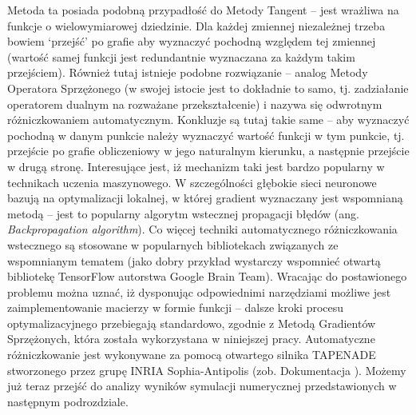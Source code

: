 \documentclass[12pt, twoside]{book}
\begin{document}
Metoda ta posiada podobną przypadłość do Metody Tangent – jest wrażliwa na funkcje o wielowymiarowej dziedzinie. Dla każdej zmiennej niezależnej trzeba bowiem ‘przejść’ po grafie aby wyznaczyć pochodną względem tej zmiennej (wartość samej funkcji jest redundantnie wyznaczana za każdym takim przejściem).  Również tutaj istnieje podobne rozwiązanie – analog Metody Operatora Sprzężonego (w swojej istocie jest to dokładnie to samo, tj. zadziałanie operatorem dualnym na rozważane przekształcenie) i nazywa się odwrotnym różniczkowaniem automatycznym.\newline
Konkluzje są tutaj takie same – aby wyznaczyć pochodną w danym punkcie należy wyznaczyć wartość funkcji w tym punkcie, tj. przejście po grafie obliczeniowy w jego naturalnym kierunku, a następnie przejście w drugą stronę. Interesujące jest, iż mechanizm taki jest bardzo popularny w technikach uczenia maszynowego. W szczególności głębokie sieci neuronowe bazują na optymalizacji lokalnej, w której gradient wyznaczany jest wspomnianą metodą – jest to popularny algorytm wstecznej propagacji błędów (ang. \textit{Backpropagation algorithm}). Co więcej techniki automatycznego różniczkowania wstecznego są stosowane w popularnych bibliotekach związanych ze wspomnianym tematem (jako dobry przykład wystarczy wspomnieć otwartą bibliotekę TensorFlow autorstwa Google Brain Team). \newline
Wracając do postawionego problemu można uznać, iż dysponując odpowiednimi narzędziami możliwe jest zaimplementowanie macierzy w formie funkcji – dalsze kroki procesu optymalizacyjnego przebiegają standardowo, zgodnie z Metodą Gradientów Sprzężonych, która została wykorzystana w niniejszej pracy. Automatyczne różniczkowanie jest wykonywane za pomocą otwartego silnika TAPENADE stworzonego przez grupę INRIA Sophia-Antipolis (zob. Dokumentacja \cite{Tapenade}). Możemy już teraz przejść do analizy wyników symulacji numerycznej przedstawionych w następnym podrozdziale.
\end{document}
